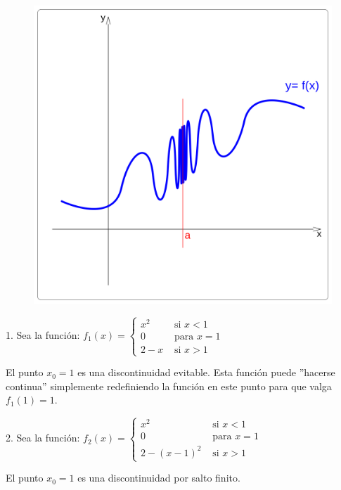 \begin{figure}[hbp]
\includegraphics[scale=0.06]{img/Funs/2f6}
\end{figure}




\begin{example}
1.  Sea la función: $f_1(x)=\left\{\begin{matrix}x^2 & \mbox{ si } x<1 \\ 0 & \mbox { para } x=1 \\ 2-x&  \mbox{ si } x>1\end{matrix}\right.$ 

El punto $x_0=1$ es una discontinuidad evitable. Esta función puede ''hacerse continua'' simplemente redefiniendo la función en este punto para que valga $f_1(1)=1$.
\end{example}

\begin{example}
2. Sea la función: $f_2(x)=\left\{\begin{matrix}x^2 & \mbox{ si } x<1 \\ 0 & \mbox { para } x=1 \\ 2-(x-1)^2& \mbox{ si } x>1\end{matrix}\right.$

El punto $x_0=1$ es una discontinuidad por salto finito.
\end{example}

